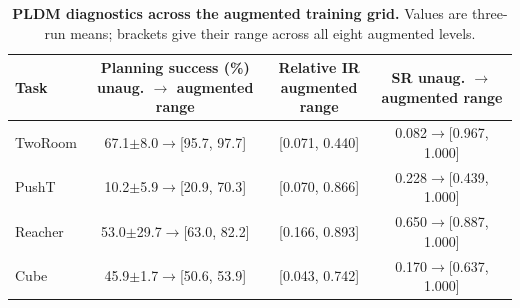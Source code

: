 \begin{table}[H]
\centering
\caption{\textbf{PLDM diagnostics across the augmented training grid.}
Values are three-run means; brackets give their range across all eight
augmented levels.}
\label{tab:pldm-all-levels}
\footnotesize
\setlength{\tabcolsep}{5.0pt}
\begin{tabular}{lccc}
\toprule
Task & \shortstack{Planning success (\%)\\unaug. $\to$ augmented range} & \shortstack{Relative IR\\augmented range} & \shortstack{SR\\unaug. $\to$ augmented range} \\
\midrule
TwoRoom & 67.1$\pm$8.0$\to$[95.7, 97.7] & [0.071, 0.440] & 0.082$\to$[0.967, 1.000] \\
PushT & 10.2$\pm$5.9$\to$[20.9, 70.3] & [0.070, 0.866] & 0.228$\to$[0.439, 1.000] \\
Reacher & 53.0$\pm$29.7$\to$[63.0, 82.2] & [0.166, 0.893] & 0.650$\to$[0.887, 1.000] \\
Cube & 45.9$\pm$1.7$\to$[50.6, 53.9] & [0.043, 0.742] & 0.170$\to$[0.637, 1.000] \\
\bottomrule
\end{tabular}
\end{table}
